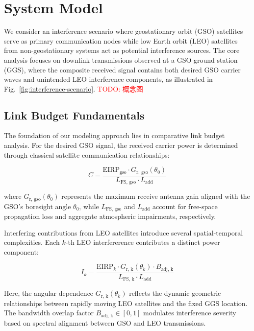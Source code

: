 \documentclass[10pt,twocolumn]{article}
\newcommand{\todo}[1]{\textcolor{red}{TODO: #1}}
\begin{document}
\section{System Model}
\label{sec:system_model}

We consider an interference scenario where geostationary orbit (GSO) satellites serve as primary communication nodes while low Earth orbit (LEO) satellites from non-geostationary systems act as potential interference sources. The core analysis focuses on downlink transmissions observed at a GSO ground station (GGS), where the composite received signal contains both desired GSO carrier waves and unintended LEO interference components, as illustrated in Fig.~\ref{fig:interference-scenario}. \todo{概念图}

\subsection{Link Budget Fundamentals}
The foundation of our modeling approach lies in comparative link budget analysis. For the desired GSO signal, the received carrier power is determined through classical satellite communication relationships:

\begin{equation}
    C = \frac{\text{EIRP}_{\text{gso}} \cdot G_{\text{r, gso}}(\theta_0)}{L_{\text{FS, gso}} \cdot L_{\text{add}}}
\end{equation}

where $G_{\text{r, gso}}(\theta_0)$ represents the maximum receive antenna gain aligned with the GSO's boresight angle $\theta_0$, while $L_{\text{FS, gso}}$ and $L_{\text{add}}$ account for free-space propagation loss and aggregate atmospheric impairments, respectively.

Interfering contributions from LEO satellites introduce several spatial-temporal complexities. Each $k$-th LEO interfererence contributes a distinct power component:

\begin{equation}
    I_k = \frac{\text{EIRP}_k \cdot G_{\text{r, k}}(\theta_k) \cdot B_{\text{adj, k}}}{L_{\text{FS, k}} \cdot L_{\text{add}}}
\end{equation}

Here, the angular dependence $G_{\text{r, k}}(\theta_k)$ reflects the dynamic geometric relationships between rapidly moving LEO satellites and the fixed GGS location. The bandwidth overlap factor $B_{\text{adj, k}} \in [0,1]$ modulates interference severity based on spectral alignment between GSO and LEO transmissions.
\end{document}
